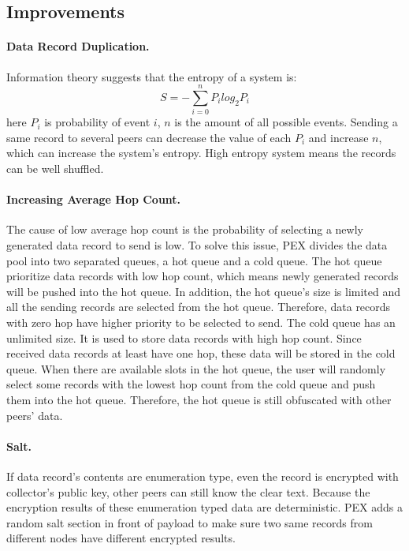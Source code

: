 \documentclass[twocolumn]{article}
\begin{document}
\subsection{Improvements}
\paragraph{Data Record Duplication.} Information theory suggests that the entropy of a system is:
\begin{equation}
S=-\sum_{i=0}^n{P_i log_2 P_i}
\end{equation}
here $P_i$ is probability of event $i$, $n$ is the amount of all possible events. Sending a same record to several peers can decrease the value of each $P_i$ and increase $n$, which can increase the system's entropy. High entropy system means the records can be well shuffled.

\paragraph{Increasing Average Hop Count.} The cause of low average hop count is the probability of selecting a newly generated data record to send is low. To solve this issue, PEX divides the data pool into two separated queues, a hot queue and a cold queue. The hot queue prioritize data records with low hop count, which means newly generated records will be pushed into the hot queue. In addition, the hot queue's size is limited and all the sending records are selected from the hot queue. Therefore, data records with zero hop have higher priority to be selected to send. The cold queue has an unlimited size. It is used to store data records with high hop count. Since received data records at least have one hop, these data will be stored in the cold queue. When there are available slots in the hot queue, the user will randomly select some records with the lowest hop count from the cold queue and push them into the hot queue. Therefore, the hot queue is still obfuscated with other peers' data.

\paragraph{Salt.} If data record's contents are enumeration type, even the record is encrypted with collector's public key, other peers can still know the clear text. Because the encryption results of these enumeration typed data are deterministic. PEX adds a random salt section in front of payload to make sure two same records from different nodes have different encrypted results.
\end{document}
